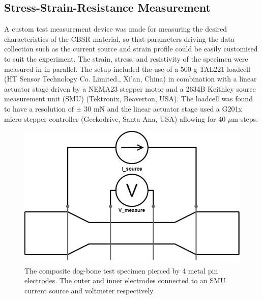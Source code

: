 
\subsection{Stress-Strain-Resistance Measurement}
A custom test measurement device was made for measuring the desired characteristics of the CBSR material, so that parameters driving the data collection such as the current source and strain profile could be easily customised to suit the experiment. The strain, stress, and resistivity of the specimen were measured in in parallel. The setup included the use of a 500 g TAL221 loadcell (HT Sensor Technology Co. Limited., Xi'an, China) in combination with a linear actuator stage driven by a NEMA23 stepper motor and a 2634B Keithley source measurement unit (SMU) (Tektronix, Beaverton, USA). The loadcell was found to have a resolution of $\pm$ 30 mN and the linear actuator stage used a G201x micro-stepper controller (Geckodrive, Santa Ana, USA) allowing for 40 $\mu$m steps.
\begin{figure}[H]
	\centering
	\includegraphics[width=0.5\linewidth]{Figures/4wire_specimen.png}
	\caption{The composite dog-bone test specimen pierced by 4 metal pin electrodes. The outer and inner electrodes connected to an SMU current source and voltmeter respectively}
	\label{fig:four_wire_dogbone}
\end{figure}

